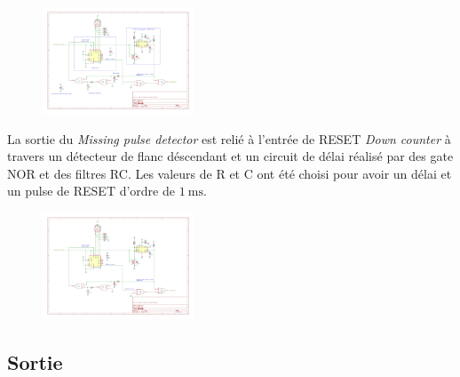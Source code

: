 \documentclass[french]{layout/Report}
\begin{document}
\begin{description}[leftmargin=!,labelwidth=4cm, labelindent=\parindent]
        \begin{figure}[H]
            \centering
            \includegraphics[width=0.4\textwidth]{fig/decoder_output_logic.pdf}
        \end{figure}

        La sortie du \textit{Missing pulse detector} est relié à l'entrée de RESET \textit{Down counter}
        à travers un détecteur de flanc déscendant et un circuit de délai réalisé par des gate NOR et des filtres RC.
        Les valeurs de R et C ont été choisi pour avoir un délai et un pulse de RESET d'ordre de $\SI{1}{\milli\second}$.
        \begin{figure}[H]
            \centering
            \includegraphics[width=0.4\textwidth]{fig/decoder_reset_delay.pdf}
        \end{figure}

\end{description}

\subsection{Sortie}
\end{document}
